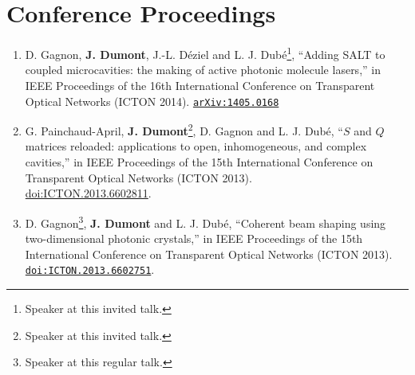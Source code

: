 \section*{Conference Proceedings}
\begin{enumerate}
 \item D. Gagnon, \textbf{J. Dumont}, J.-L. Déziel and L. J. Dubé\footnote{Speaker at this invited talk.}, 
	``Adding SALT to coupled microcavities: the making of active photonic molecule lasers,''
	in IEEE Proceedings of the 16th International Conference on Transparent Optical Networks (ICTON 2014).
	\href{http://arxiv.org/abs/1405.0168}{\texttt{arXiv:1405.0168}}
 \item G. Painchaud-April, \textbf{J. Dumont}\footnote{Speaker at this invited talk.}, D. Gagnon and L. J. Dubé, 
	``$S$ and $Q$ matrices reloaded: applications to open, inhomogeneous, and complex cavities,''
	in IEEE Proceedings of the 15th International Conference on Transparent Optical Networks (ICTON 2013).
	\\\href{http://dx.doi.org/10.1109/ICTON.2013.6602811}{doi:ICTON.2013.6602811}.
 \item D. Gagnon\footnote{Speaker at this regular talk.}, \textbf{J. Dumont} and L. J. Dubé, 
	``Coherent beam shaping using two-dimensional photonic crystals,''
	in IEEE Proceedings of the 15th International Conference on Transparent Optical Networks (ICTON 2013).
	\href{http://dx.doi.org/10.1109/ICTON.2013.6602751}{\texttt{doi:ICTON.2013.6602751}}.
\end{enumerate}


